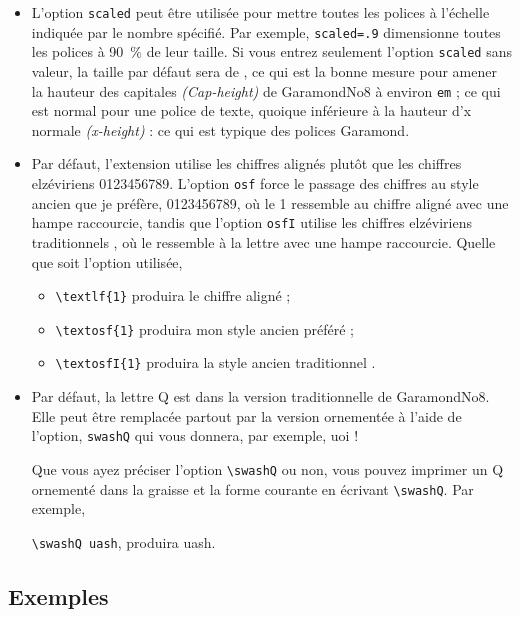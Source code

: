 \documentclass[12pt,english,french]{article}
\newcommand{\cmd}[1]{\texttt{#1}}
\begin{document}
\begin{itemize}
\item
L'option \cmd{scaled} peut être utilisée pour mettre toutes les polices à l'échelle indiquée par le nombre spécifié. Par exemple, \cmd{scaled=.9} dimensionne toutes les polices à 90~\% de leur taille. Si vous entrez seulement l'option \cmd{scaled} sans valeur, la taille par défaut sera de , ce qui est la bonne mesure pour amener la hauteur des capitales \emph{(Cap-height)} de GaramondNo8 à environ  \cmd{em} ; ce qui est normal  pour une police de texte, quoique inférieure à la hauteur d'x normale \emph{(x-height)} : ce qui est typique des polices Garamond.
\item
Par défaut, l'extension utilise les chiffres alignés  plutôt que les chiffres elzéviriens 0123456789. L'option \cmd{osf} force le passage des chiffres au style ancien que je préfère, 0123456789, où le 1 ressemble au chiffre  aligné avec une hampe raccourcie, tandis que l'option \cmd{osfI} utilise les chiffres elzéviriens  traditionnels , où le  ressemble à la lettre  avec une hampe raccourcie. Quelle que soit l'option utilisée,


\begin{itemize}
\item
\verb+\textlf{1}+ produira le chiffre  aligné ; 
\item
\verb+\textosf{1}+ produira mon style ancien préféré  ;
\item
\verb+\textosfI{1}+ produira la style ancien traditionnel . 
\end{itemize}

\item
Par défaut, la lettre Q est dans la version traditionnelle de GaramondNo8. Elle peut être remplacée partout par la version ornementée à l'aide de l'option, \cmd{swashQ} qui vous donnera, par exemple, \swashQ uoi !

Que vous ayez préciser l'option \verb+\swashQ+ ou non, vous pouvez imprimer un Q ornementé dans la graisse  et la forme courante en écrivant \verb+\swashQ+. Par exemple,

\verb+\swashQ uash+, produira \swashQ uash.
\end{itemize}

\subsection{Exemples}
\end{document}
